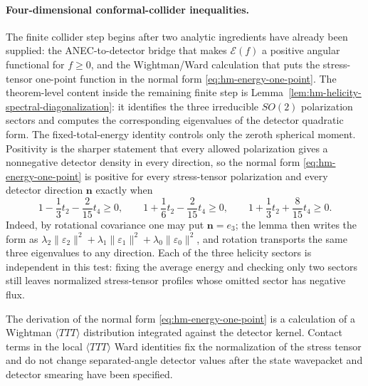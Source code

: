 \paragraph{Four-dimensional conformal-collider inequalities.}
The finite collider step begins after two analytic ingredients have already
been supplied: the ANEC-to-detector bridge that makes
\(\mathcal E(f)\) a positive angular functional for \(f\geq0\), and the
Wightman/Ward calculation that puts the stress-tensor one-point function in
the normal form \eqref{eq:hm-energy-one-point}.  The theorem-level content
inside the remaining finite step is
Lemma~\ref{lem:hm-helicity-spectral-diagonalization}: it identifies the three
irreducible \(SO(2)\) polarization sectors and computes the corresponding
eigenvalues of the detector quadratic form.  The fixed-total-energy identity
controls only the zeroth spherical moment.  Positivity is the sharper
statement that every allowed polarization gives a nonnegative detector density
in every direction, so the normal form \eqref{eq:hm-energy-one-point} is
positive for every stress-tensor polarization and every detector direction
\(\mathbf n\) exactly when
\[
  1-\frac13t_2-\frac{2}{15}t_4\geq0,
  \qquad
  1+\frac16t_2-\frac{2}{15}t_4\geq0,
  \qquad
  1+\frac13t_2+\frac{8}{15}t_4\geq0.
\]
Indeed, by rotational covariance one may put \(\mathbf n=e_3\); the lemma
then writes the form as
\(\lambda_2\|\varepsilon_2\|^2+\lambda_1\|\varepsilon_1\|^2+
\lambda_0\|\varepsilon_0\|^2\), and rotation transports the same three
eigenvalues to any direction.  Each of the three helicity sectors is
independent in this test: fixing the average energy and checking only two
sectors still leaves normalized stress-tensor profiles whose omitted sector
has negative flux.

The derivation of the normal form
\eqref{eq:hm-energy-one-point} is a calculation of a Wightman
\(\langle TTT\rangle\) distribution integrated against the detector kernel.
Contact terms in the local \(\langle TTT\rangle\) Ward identities fix the
normalization of the stress tensor and do not change separated-angle detector
values after the state wavepacket and detector smearing have been specified.

